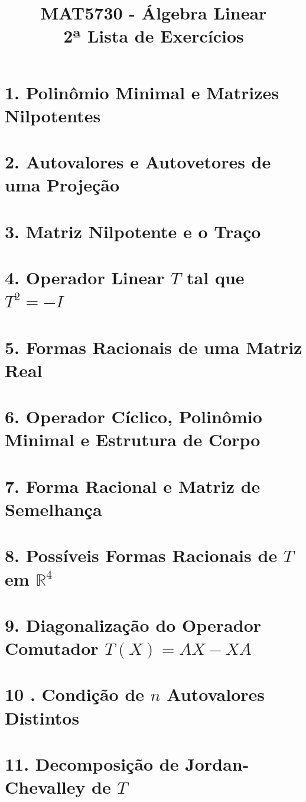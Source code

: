\documentclass[12pt,a4paper]{article}
\title{MAT5730 - Álgebra Linear \\ 2ª Lista de Exercícios}
\date{}
\begin{document}
\maketitle
\section*{1. Polinômio Minimal e Matrizes Nilpotentes}


\section*{2. Autovalores e Autovetores de uma Projeção}


\section*{3. Matriz Nilpotente e o Traço}


\section*{4. Operador Linear $T$ tal que $T^2=-I$}


\section*{5. Formas Racionais de uma Matriz Real}


\section*{6. Operador Cíclico, Polinômio Minimal e Estrutura de Corpo}


\section*{7. Forma Racional e Matriz de Semelhança}


\section*{8. Possíveis Formas Racionais de $T$ em $\mathbb{R}^4$}


\section*{9. Diagonalização do Operador Comutador $T(X)=AX-XA$}


\section*{10 . Condição de $n$ Autovalores Distintos}


\section*{11. Decomposição de Jordan-Chevalley de $T$}

\end{document}

